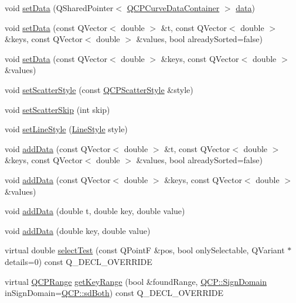 \begin{DoxyCompactItemize}
\item 
void \hyperlink{classQCPCurve_a41246850d2e080bc57183ca19cd4135e}{set\+Data} (Q\+Shared\+Pointer$<$ \hyperlink{classQCPDataContainer}{Q\+C\+P\+Curve\+Data\+Container} $>$ \hyperlink{classQCPCurve_ad89c71fdd1726506c21c0cc471547368}{data})
\item 
void \hyperlink{classQCPCurve_a0768af2c33c8dcffa3cf5bdeb53923a6}{set\+Data} (const Q\+Vector$<$ double $>$ \&t, const Q\+Vector$<$ double $>$ \&keys, const Q\+Vector$<$ double $>$ \&values, bool already\+Sorted=false)
\item 
void \hyperlink{classQCPCurve_a9d3245d43304226e013240c94802f7f6}{set\+Data} (const Q\+Vector$<$ double $>$ \&keys, const Q\+Vector$<$ double $>$ \&values)
\item 
void \hyperlink{classQCPCurve_a55e43b44709bf50a35500644988aa706}{set\+Scatter\+Style} (const \hyperlink{classQCPScatterStyle}{Q\+C\+P\+Scatter\+Style} \&style)
\item 
void \hyperlink{classQCPCurve_a97dbfecd497e972d5f2162615e6da5be}{set\+Scatter\+Skip} (int skip)
\item 
void \hyperlink{classQCPCurve_a4a377ec863ff81a1875c3094a6177c19}{set\+Line\+Style} (\hyperlink{classQCPCurve_a2710e9f79302152cff794c6e16cc01f1}{Line\+Style} style)
\item 
void \hyperlink{classQCPCurve_a73edf394b94f3f24f07518e30565a07f}{add\+Data} (const Q\+Vector$<$ double $>$ \&t, const Q\+Vector$<$ double $>$ \&keys, const Q\+Vector$<$ double $>$ \&values, bool already\+Sorted=false)
\item 
void \hyperlink{classQCPCurve_a6424fa06da1786648c83ad13a0d0aa14}{add\+Data} (const Q\+Vector$<$ double $>$ \&keys, const Q\+Vector$<$ double $>$ \&values)
\item 
void \hyperlink{classQCPCurve_a13398b236f6926014e404eeb5b9f415c}{add\+Data} (double t, double key, double value)
\item 
void \hyperlink{classQCPCurve_ada4762e793cd5707b33f35b8a4b0f8fb}{add\+Data} (double key, double value)
\item 
virtual double \hyperlink{classQCPCurve_a0ed9b7e6b4bc72010d6fcd974af46a8b}{select\+Test} (const Q\+PointF \&pos, bool only\+Selectable, Q\+Variant $\ast$details=0) const Q\+\_\+\+D\+E\+C\+L\+\_\+\+O\+V\+E\+R\+R\+I\+DE
\item 
virtual \hyperlink{classQCPRange}{Q\+C\+P\+Range} \hyperlink{classQCPCurve_a22d09087f78f254731197cc0b8783299}{get\+Key\+Range} (bool \&found\+Range, \hyperlink{namespaceQCP_afd50e7cf431af385614987d8553ff8a9}{Q\+C\+P\+::\+Sign\+Domain} in\+Sign\+Domain=\hyperlink{namespaceQCP_afd50e7cf431af385614987d8553ff8a9aa38352ef02d51ddfa4399d9551566e24}{Q\+C\+P\+::sd\+Both}) const Q\+\_\+\+D\+E\+C\+L\+\_\+\+O\+V\+E\+R\+R\+I\+DE

\end{DoxyCompactItemize}
